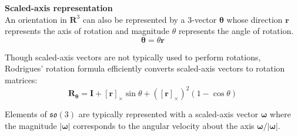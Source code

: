 		\textbf{Scaled-axis representation}\\
		An orientation in $\mathbf{R}^3$ can also be represented by a 3-vector $\bm{\theta}$ whose direction $\mathbf{r}$ represents the axis of rotation and magnitude $\theta$ represents the angle of rotation.
		\begin{equation}
			\bm{\theta} = \theta\mathbf{r}
		\end{equation}
		
		Though scaled-axis vectors are not typically used to perform rotations, Rodrigues' rotation formula efficiently converts scaled-axis vectors to rotation matrices:
		\begin{equation}
			\mathbf{R}_{\bm{\theta}} = \mathbf{I} + [\mathbf{r}]_{\times}\sin{\theta} + ([\mathbf{r}]_{\times})^2(1-\cos{\theta})
		\end{equation}
					
		Elements of $\mathfrak{so}(3)$ are typically represented with a scaled-axis vector $\bm{\omega}$ where the magnitude $|\bm{\omega}|$ corresponds to the angular velocity about the axis $\bm{\omega}/|\bm{\omega}|$.
					
